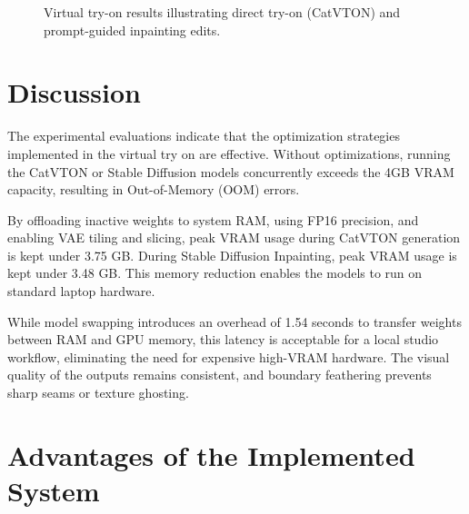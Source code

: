 \documentclass[12pt, a4paper]{report}
\begin{document}
\begin{figure}[htbp]
    \centering
    \caption{Virtual try-on results illustrating direct try-on (CatVTON) and prompt-guided inpainting edits.}
    \label{fig:screenshot_tryon}
\end{figure}

\section{Discussion}

The experimental evaluations indicate that the optimization strategies implemented in the virtual try on are effective. Without optimizations, running the CatVTON or Stable Diffusion models concurrently exceeds the 4GB VRAM capacity, resulting in Out-of-Memory (OOM) errors.

By offloading inactive weights to system RAM, using FP16 precision, and enabling VAE tiling and slicing, peak VRAM usage during CatVTON generation is kept under 3.75 GB. During Stable Diffusion Inpainting, peak VRAM usage is kept under 3.48 GB. This memory reduction enables the models to run on standard laptop hardware.

While model swapping introduces an overhead of 1.54 seconds to transfer weights between RAM and GPU memory, this latency is acceptable for a local studio workflow, eliminating the need for expensive high-VRAM hardware. The visual quality of the outputs remains consistent, and boundary feathering prevents sharp seams or texture ghosting.

\section{Advantages of the Implemented System}
\end{document}
